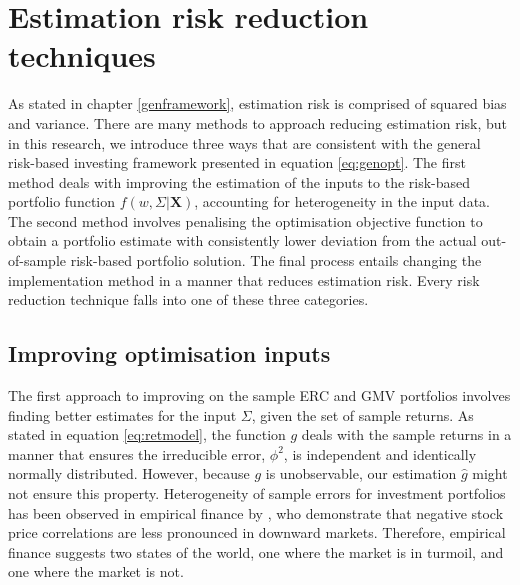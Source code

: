 \documentclass[
]{article}
\begin{document}
\hypertarget{estriskreduce}{%
\section{Estimation risk reduction techniques}\label{estriskreduce}}

As stated in chapter \ref{genframework}, estimation risk is comprised of squared bias and variance.
There are many methods to approach reducing estimation risk, but in this research, we introduce three
ways that are consistent with the general risk-based investing framework presented in equation
\eqref{eq:genopt}. The first method deals with improving the estimation of the inputs to the risk-based
portfolio function \(f(w, \Sigma|\textbf{X})\), accounting for heterogeneity in the input data. The
second method involves penalising the optimisation objective function to obtain a portfolio estimate
with consistently lower deviation from the actual out-of-sample risk-based portfolio solution. The
final process entails changing the implementation method in a manner that reduces estimation risk.
Every risk reduction technique falls into one of these three categories.

\hypertarget{improving-optimisation-inputs}{%
\subsection{Improving optimisation inputs}\label{improving-optimisation-inputs}}

The first approach to improving on the sample ERC and GMV portfolios involves finding better estimates
for the input \(\Sigma\), given the set of sample returns. As stated in equation \eqref{eq:retmodel},
the function \(g\) deals with the sample returns in a manner that ensures the irreducible error,
\(\phi^2\), is independent and identically normally distributed. However, because \(g\) is unobservable,
our estimation \(\hat{g}\) might not ensure this property. Heterogeneity of sample errors for investment
portfolios has been observed in empirical finance by \citet{AC02}, who demonstrate that negative stock
price correlations are less pronounced in downward markets. Therefore, empirical finance suggests two
states of the world, one where the market is in turmoil, and one where the market is not.
\end{document}

